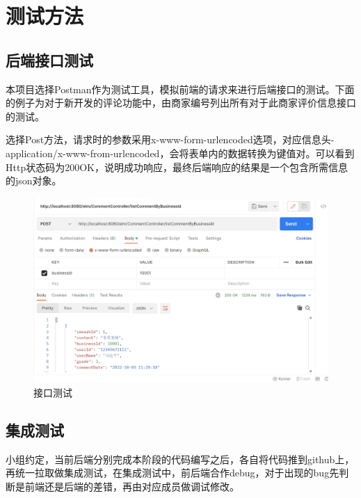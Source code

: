 
\chapter{测试方法}

\section{后端接口测试}

本项目选择Postman作为测试工具，模拟前端的请求来进行后端接口的测试。下面的例子为对于新开发的评论功能中，由商家编号列出所有对于此商家评价信息接口的测试。

选择Post方法，请求时的参数采用x-www-form-urlencoded选项，对应信息头-application/x-www-from-urlencoded，会将表单内的数据转换为键值对。可以看到Http状态码为200OK，说明成功响应，最终后端响应的结果是一个包含所需信息的json对象。

\begin{figure}[H]
    \centering
    \includegraphics[scale=0.3]{figures/7.1.1.png}
    \caption{接口测试}
\end{figure}

\section{集成测试}
小组约定，当前后端分别完成本阶段的代码编写之后，各自将代码推到github上，再统一拉取做集成测试，在集成测试中，前后端合作debug，对于出现的bug先判断是前端还是后端的差错，再由对应成员做调试修改。








